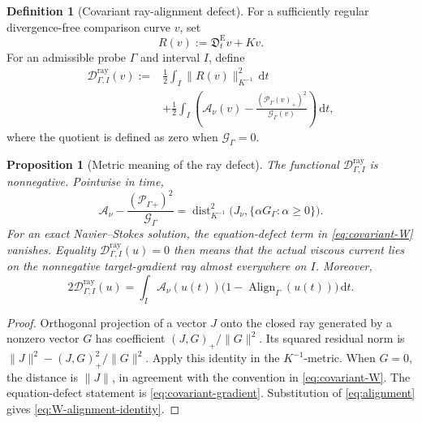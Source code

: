 \documentclass[11pt]{amsart}
\numberwithin{equation}{section}
\theoremstyle{plain}
\newtheorem{proposition}[proposition]{Proposition}
\theoremstyle{definition}
\newtheorem{definition}[definition]{Definition}
\theoremstyle{remark}
\newcommand{\dd}{\,\mathrm d}
\newcommand{\Action}{\mathcal A}
\newcommand{\ProbeDirichlet}{\mathcal G}
\newcommand{\Power}{\mathcal P}
\newcommand{\Align}{\operatorname{Align}}
\newcommand{\RayDefect}{\mathscr D^{\mathrm{ray}}}
\newcommand{\Dcov}{\mathfrak D}
\begin{document}
\begin{definition}[Covariant ray-alignment defect]
\label{def:covariant-W}
For a sufficiently regular divergence-free comparison curve \(v\), set
\begin{equation}\label{eq:equation-defect}
 R(v):=\Dcov_t^{\mathrm E}v+Kv.
\end{equation}
For an admissible probe \(\Gamma\) and interval \(I\), define
\begin{equation}\label{eq:covariant-W}
 \begin{aligned}
 \RayDefect_{\Gamma,I}(v)
 :={}&\frac12\int_I\|R(v)\|_{K^{-1}}^2\dd t\\
 &+\frac12\int_I
 \left(
 \Action_\nu(v)
 -\frac{(\Power_\Gamma(v)_+)^2}{\ProbeDirichlet_\Gamma(v)}
 \right)\dd t,
 \end{aligned}
\end{equation}
where the quotient is defined as zero when
\(\ProbeDirichlet_\Gamma=0\).
\end{definition}

\begin{proposition}[Metric meaning of the ray defect]
\label{prop:W-distance}
The functional \(\RayDefect_{\Gamma,I}\) is nonnegative.  Pointwise in time,
\begin{equation}\label{eq:ray-distance}
 \Action_\nu
 -\frac{(\Power_\Gamma{}_+)^2}{\ProbeDirichlet_\Gamma}
 =\operatorname{dist}_{K^{-1}}^2
 \bigl(J_\nu,\{\alpha G_\Gamma:\alpha\ge0\}\bigr).
\end{equation}
For an exact Navier--Stokes solution, the equation-defect term in
\eqref{eq:covariant-W} vanishes.  Equality
\(\RayDefect_{\Gamma,I}(u)=0\) then means that the actual viscous current lies on
the nonnegative target-gradient ray almost everywhere on \(I\).  Moreover,
\begin{equation}\label{eq:W-alignment-identity}
 2\RayDefect_{\Gamma,I}(u)
 =\int_I\Action_\nu(u(t))
   \bigl(1-\Align_\Gamma(u(t))\bigr)\dd t.
\end{equation}
\end{proposition}

\begin{proof}
Orthogonal projection of a vector \(J\) onto the closed ray generated by a
nonzero vector \(G\) has coefficient
\((J,G)_+ /\|G\|^2\).  Its squared residual norm is
\(\|J\|^2-(J,G)_+^2/\|G\|^2\).  Apply this identity in the
\(K^{-1}\)-metric.  When \(G=0\), the distance is \(\|J\|\), in agreement
with the convention in \eqref{eq:covariant-W}.  The equation-defect statement
is \eqref{eq:covariant-gradient}.  Substitution of
\eqref{eq:alignment} gives \eqref{eq:W-alignment-identity}.
\end{proof}
\end{document}
